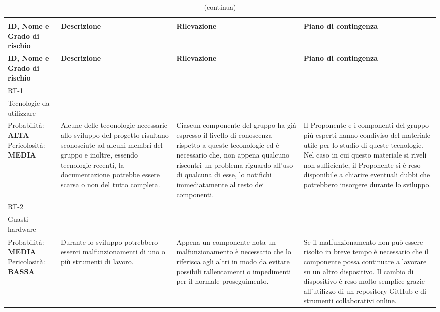 \begin{longtable}{
		>{\centering}p{}
		>{\centering}p{}
		>{\centering}p{}
		>{\centering\arraybackslash}p{} }

	\rowcolor{white}\caption{Analisi dei  del progetto} \\
	\textbf{\color{white}ID, Nome e Grado di rischio} &
	\textbf{\color{white}Descrizione} &
	\textbf{\color{white}Rilevazione} &
	\textbf{\color{white}Piano di contingenza}
	\endfirsthead

	\rowcolor{white}\caption[]{(continua)}\\
	\textbf{\color{white}ID, Nome e Grado di rischio} &
	\textbf{\color{white}Descrizione} &
	\textbf{\color{white}Rilevazione} &
	\textbf{\color{white}Piano di contingenza}
	\endhead

	\hline \multicolumn{4}{c}{\textit{Continua nella prossima pagina}} \\
	\endfoot
	\hline
	\endlastfoot


	\rowcolor{lightRowColor}
	RT-1 \\ Tecnologie da utilizzare \\
		\vspace{5mm} %
	 	Probabilità: \textbf{ALTA} Pericolosità: \textbf{MEDIA}
		&
		Alcune delle teconologie necessarie allo sviluppo del progetto risultano sconosciute ad alcuni membri del gruppo e inoltre, essendo tecnologie recenti, la documentazione potrebbe essere scarsa o non del tutto completa.
		&
		Ciascun componente del gruppo ha già espresso il livello di conoscenza rispetto a queste teconologie ed è necessario che, non appena qualcuno riscontri un problema riguardo all'uso di qualcuna di esse, lo notifichi immediatamente al resto dei componenti.
		&
		Il Proponente\ped{\textit{G}} e i componenti del gruppo più esperti hanno condiviso del materiale utile per lo studio di queste tecnologie. Nel caso in cui questo materiale si riveli non sufficiente, il Proponente\ped{\textit{G}} si è reso disponibile a chiarire eventuali dubbi che potrebbero insorgere durante lo sviluppo. \\

	\rowcolor{darkRowColor}
	RT-2 \\ Guasti hardware \\
		\vspace{5mm} %
		Probabilità: \textbf{MEDIA} Pericolosità: \textbf{BASSA}
		&
		Durante lo sviluppo potrebbero esserci malfunzionamenti di uno o più strumenti di lavoro.
		&
		Appena un componente nota un malfunzionamento è necessario che lo riferisca agli altri in modo da evitare possibili rallentamenti o impedimenti per il normale proseguimento.
		&
		Se il malfunzionamento non può essere risolto in breve tempo è necessario che il componente possa continuare a lavorare su un altro dispositivo. Il cambio di dispositivo è reso molto semplice grazie all'utilizzo di un repository GitHub\ped{\textit{G}} e di strumenti collaborativi online. \\


\end{longtable}
